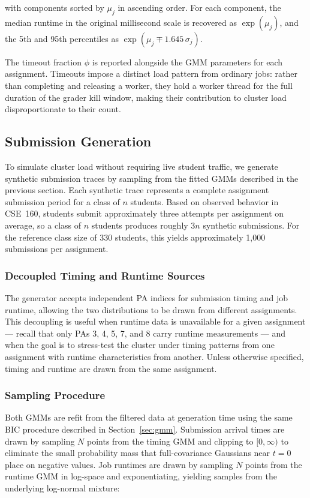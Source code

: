 \documentclass[acmlarge]{acmart}
\begin{document}
\noindent with components sorted by $\mu_j$ in ascending order.
For each component, the median runtime in the original millisecond
scale is recovered as $\exp(\mu_j)$, and the 5th and 95th percentiles
as $\exp(\mu_j \mp 1.645\,\sigma_j)$.
 
The timeout fraction $\phi$ is reported alongside the GMM parameters
for each assignment. Timeouts impose a distinct load pattern from
ordinary jobs: rather than completing and releasing a worker, they hold
a worker thread for the full duration of the grader kill window,
making their contribution to cluster load disproportionate to their
count.
 

\subsection{Submission Generation}
To simulate cluster load without requiring live student traffic, we generate synthetic submission traces by sampling from the fitted GMMs described in the previous section. Each synthetic trace represents a complete assignment submission period for a class of $n$ students. Based on observed behavior in CSE~160, students submit approximately three attempts per assignment on average, so a class of $n$ students produces roughly $3n$ synthetic submissions. For the reference class size of 330 students, this yields approximately 1,000 submissions per assignment.

\subsubsection{Decoupled Timing and Runtime Sources}
The generator accepts independent PA indices for submission timing and job runtime, allowing the two distributions to be drawn from different assignments. This decoupling is useful when runtime data is unavailable for a given assignment --- recall that only PAs 3, 4, 5, 7, and 8 carry runtime measurements --- and when the goal is to stress-test the cluster under timing patterns from one assignment with runtime characteristics from another. Unless otherwise specified, timing and runtime are drawn from the same assignment.

\subsubsection{Sampling Procedure}
 
Both GMMs are refit from the filtered data at generation time using the same BIC procedure described in Section~\ref{sec:gmm}. Submission arrival times are drawn by sampling $N$ points from the timing GMM and clipping to $[0, \infty)$ to eliminate the small probability mass that full-covariance Gaussians near $t = 0$ place on negative values. Job runtimes are drawn by sampling $N$ points from the runtime GMM in log-space and exponentiating, yielding samples from the underlying log-normal mixture:
 
\end{document}
